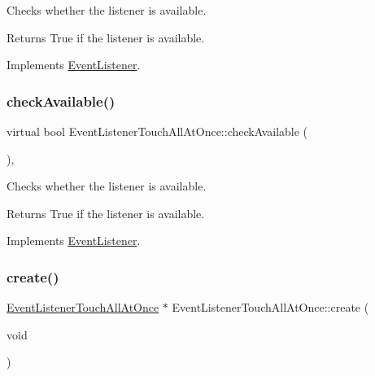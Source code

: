 Checks whether the listener is available.

\begin{DoxyReturn}{Returns}
True if the listener is available. 
\end{DoxyReturn}


Implements \hyperlink{classEventListener_adf9e4eb37ea6e94c05f4d1b6594bd35e}{Event\+Listener}.

\mbox{\label{classEventListenerTouchAllAtOnce_aa694c16160c353ed089ab1b80b003066}} 
\subsubsection{\texorpdfstring{check\+Available()}{checkAvailable()}\hspace{0.1cm}{\footnotesize\ttfamily [2/2]}}
{\footnotesize\ttfamily virtual bool Event\+Listener\+Touch\+All\+At\+Once\+::check\+Available (\begin{DoxyParamCaption}{ }\end{DoxyParamCaption})\hspace{0.3cm}{\ttfamily [override]}, {\ttfamily [virtual]}}

Checks whether the listener is available.

\begin{DoxyReturn}{Returns}
True if the listener is available. 
\end{DoxyReturn}


Implements \hyperlink{classEventListener_adf9e4eb37ea6e94c05f4d1b6594bd35e}{Event\+Listener}.

\mbox{\label{classEventListenerTouchAllAtOnce_a666b356fd573ab7cdd27340580382c06}} 
\subsubsection{\texorpdfstring{create()}{create()}\hspace{0.1cm}{\footnotesize\ttfamily [1/2]}}
{\footnotesize\ttfamily \hyperlink{classEventListenerTouchAllAtOnce}{Event\+Listener\+Touch\+All\+At\+Once} $\ast$ Event\+Listener\+Touch\+All\+At\+Once\+::create (\begin{DoxyParamCaption}\item[{void}]{ }\end{DoxyParamCaption})\hspace{0.3cm}{\ttfamily [static]}}

